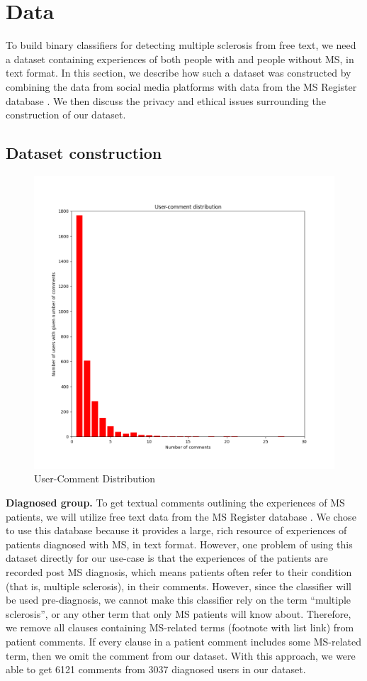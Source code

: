 \documentclass[11pt,a4paper]{article}
\begin{document}
\section{Data}
\label{sec:data}
To build binary classifiers for detecting multiple sclerosis from free text, we need a dataset containing experiences of both people with and people without MS, in text format. In this section, we describe how such a dataset was constructed by combining the data from social media platforms with data from the MS Register database \citep{Ford:12}. We then discuss the privacy and ethical issues surrounding the construction of our dataset.
\subsection{Dataset construction}
\begin{figure}[h!]
  \centering
   \includegraphics[width=\linewidth]{usercommentdistribution.png}
   \caption{User-Comment Distribution}
  \label{fig:usercomment}
\end{figure}
\textbf{Diagnosed group.} To get textual comments outlining the experiences of MS patients, we will utilize free text data from the MS Register database \citep{Ford:12}. We chose to use this database because it provides a large, rich resource of experiences of patients diagnosed with MS, in text format. However, one problem of using this dataset directly for our use-case is that the experiences of the patients are recorded post MS diagnosis, which means patients often refer to their condition (that is, multiple sclerosis), in their comments. However, since the classifier will be used pre-diagnosis, we cannot make this classifier rely on the term “multiple sclerosis”, or any other term that only MS patients will know about. Therefore, we remove all clauses containing MS-related terms (footnote with list link) from patient comments. If every clause in a patient comment includes some MS-related term, then we omit the comment from our dataset. With this approach, we were able to get 6121 comments from 3037 diagnosed users in our dataset. \\
\end{document}
